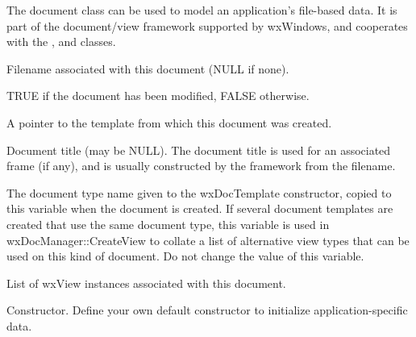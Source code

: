 
The document class can be used to model an application's file-based
data. It is part of the document/view framework supported by wxWindows,
and cooperates with the , \rtfsp
and  classes.



Filename associated with this document (NULL if none).



TRUE if the document has been modified, FALSE otherwise.



A pointer to the template from which this document was created.



Document title (may be NULL). The document title is used for an associated
frame (if any), and is usually constructed by the framework from
the filename.

\label{documenttypename}


The document type name given to the wxDocTemplate constructor, copied to this
variable when the document is created. If several document templates are
created that use the same document type, this variable is used in wxDocManager::CreateView
to collate a list of alternative view types that can be used on this kind of
document. Do not change the value of this variable.



List of wxView instances associated with this document.



Constructor. Define your own default constructor to initialize application-specific
data.

